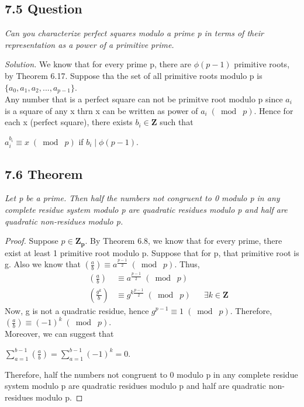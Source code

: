 \documentclass{article}
\begin{document}
\subsection*{7.5 Question} 
\quad \textit{Can you characterize perfect squares modulo a prime p in terms of their representation as a power of a primitive prime.}

\textit{Solution.} We know that for every prime p, there are $\phi(p-1)$ primitive roots, by Theorem 6.17. Suppose tha the set of all primitive roots modulo p is $\{a_0, a_1, a_2,...,a_{p-1}\}$.\\
Any number that is a perfect square can not be primitve root modulo p since $a_i$ is a square of any x thrn x can be written as power of $a_i \;(\bmod\; p)$. Hence for each x (perfect square), there exists $b_i \in \mathbf{Z}$ such that
\begin{center}
    $a_i^{b_i} \equiv x \;(\bmod\; p)$ if $b_i \mid \phi(p-1)$.
\end{center}

\subsection*{7.6 Theorem} 
\quad \textit{Let p be a prime. Then half the numbers not congruent to 0 modulo p in any complete residue system modulo p are quadratic residues modulo p and half are quadratic non-residues modulo p.}

\begin{proof}
Suppose $p \in \mathbf{Z_p}$. By Theorem 6.8, we know that for every prime, there exist at least 1 primitive root modulo p. Suppose that for p, that primitive root is g. Also we know that $(\frac{a}{b}) \equiv a^{\frac{p-1}{2}} \;(\bmod\; p)$. Thus,
\begin{align*}
    && (\frac{a}{b}) &\equiv a^{\frac{p-1}{2}} \;(\bmod\; p)&&\\
    && (\frac{g^k}{b}) &\equiv g^{k\frac{p-1}{2}} \;(\bmod\; p)&& \textbf{$\exists k \in \mathbf{Z}$}
\end{align*}
Now, g is not a quadratic residue, hence $g^{p-1} \equiv 1 \;(\bmod\; p)$. Therefore, $(\frac{a}{b}) \equiv (-1)^k \;(\bmod\; p)$.\\
Moreover, we can suggest that 
\begin{center}
    $\sum_{a=1}^{b-1} (\frac{a}{b}) = \sum_{a=1}^{b-1} (-1)^k = 0$.
\end{center}
Therefore, half the numbers not congruent to 0 modulo p in any complete residue system modulo p are quadratic residues modulo p and half are quadratic non-residues modulo p.
\end{proof}
\end{document}
